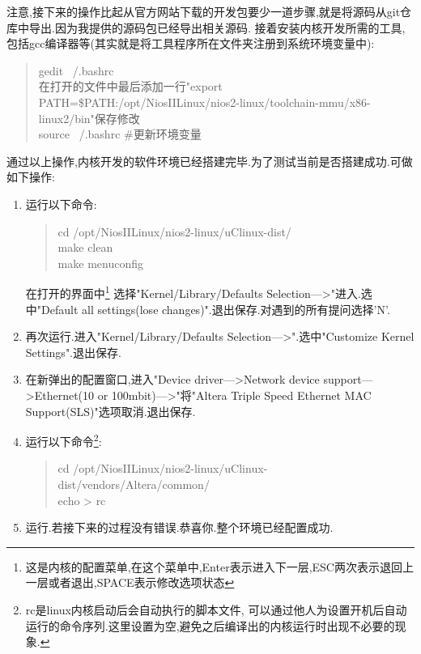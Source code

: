 \documentclass[12pt,a4paper,titlepage]{article}
\begin{document}
{注意,接下来的操作比起从官方网站下载的开发包要少一道步骤,就是将源码从git仓库中导出.因为我提供的源码包已经导出相关源码.}
接着安装内核开发所需的工具,包括gcc编译器等(其实就是将工具程序所在文件夹注册到系统环境变量中):
\begin{verse}
gedit ~/.bashrc\\在打开的文件中最后添加一行"export PATH=\$PATH:/opt/NiosIILinux/nios2-linux/toolchain-mmu/x86-linux2/bin"保存修改\\
source ~/.bashrc \#更新环境变量
\end{verse}
通过以上操作,内核开发的软件环境已经搭建完毕.为了测试当前是否搭建成功.可做如下操作:
\begin{enumerate}
\item 运行以下命令:
\begin{verse}
cd /opt/NiosIILinux/nios2-linux/uClinux-dist/\\make clean\\make menuconfig
\end{verse}
在打开的界面中\footnote{这是内核的配置菜单,在这个菜单中,Enter表示进入下一层,ESC两次表示退回上一层或者退出,SPACE表示修改选项状态}
选择"Kernel/Library/Defaults Selection--->"进入.选中"Default all settings(lose changes)".退出保存.对遇到的所有提问选择'N'.
\item 再次运行.进入"Kernel/Library/Defaults Selection--->".选中"Customize Kernel Settings".退出保存.
\item 在新弹出的配置窗口,进入"Device driver--->Network device support--->Ethernet(10 or 100mbit)--->"将"Altera Triple Speed Ethernet 
MAC Support(SLS)"选项取消.退出保存.
\item 运行以下命令\footnote{rc是linux内核启动后会自动执行的脚本文件,
可以通过他人为设置开机后自动运行的命令序列.这里设置为空,避免之后编译出的内核运行时出现不必要的现象.}:
\begin{verse}cd /opt/NiosIILinux/nios2-linux/uClinux-dist/vendors/Altera/common/\\echo > rc\end{verse}
\item 运行.若接下来的过程没有错误.恭喜你.整个环境已经配置成功.
\end{enumerate}
\end{document}
